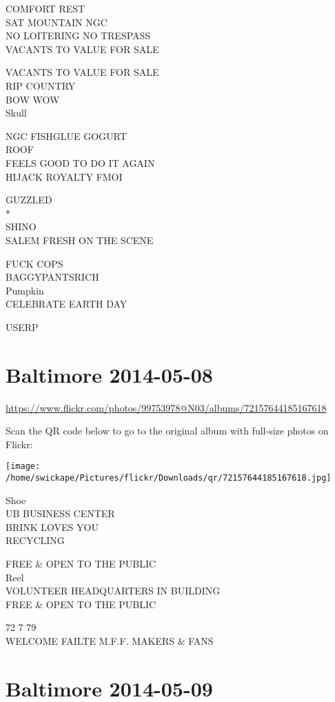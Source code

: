 \documentclass[10pt,letterpaper]{article}
\begin{document}
COMFORT REST\\
SAT MOUNTAIN NGC\\
NO LOITERING NO TRESPASS\\
VACANTS TO VALUE FOR SALE

VACANTS TO VALUE FOR SALE\\
RIP COUNTRY\\
BOW WOW\\
Skull

NGC FISHGLUE GOGURT\\
ROOF\\
FEELS GOOD TO DO IT AGAIN\\
HIJACK ROYALTY FMOI

GUZZLED\\
*\\
SHINO\\
SALEM FRESH ON THE SCENE

FUCK COPS\\
BAGGYPANTSRICH\\
Pumpkin\\
CELEBRATE EARTH DAY

USERP


\section*{Baltimore 2014-05-08}

\url{https://www.flickr.com/photos/99753978@N03/albums/72157644185167618}

Scan the QR code below to go to the original album with full-size photos on Flickr:

\texttt{[image: /home/swickape/Pictures/flickr/Downloads/qr/72157644185167618.jpg]}


Shoe\\
UB BUSINESS CENTER\\
BRINK LOVES YOU\\
RECYCLING

FREE \& OPEN TO THE PUBLIC\\
Reel\\
VOLUNTEER HEADQUARTERS IN BUILDING\\
FREE \& OPEN TO THE PUBLIC

72 7 79\\
WELCOME FAILTE M.F.F. MAKERS \& FANS


\section*{Baltimore 2014-05-09}
\end{document}

